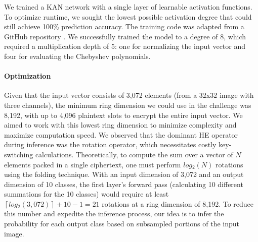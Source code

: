 \documentclass[article]{iacrtrans}
\begin{document}
We trained a KAN network with a single layer of learnable activation functions. To optimize runtime, we sought the lowest possible activation degree that could still achieve 100\% prediction accuracy. The training code was adapted from a GitHub repository \cite{ChebyKAN}. We successfully trained the model to a degree of 8, which required a multiplication depth of 5: one for normalizing the input vector and four for evaluating the Chebyshev polynomials.

\paragraph{Optimization}\mbox{}

Given that the input vector consists of 3,072 elements (from a 32x32 image with three channels), the minimum ring dimension we could use in the challenge was 8,192, with up to 4,096 plaintext slots to encrypt the entire input vector. We aimed to work with this lowest ring dimension to minimize complexity and maximize computation speed. We observed that the dominant HE operator during inference was the rotation operator, which necessitates costly key-switching calculations. Theoretically, to compute the sum over a vector of $N$ elements packed in a single ciphertext, one must perform $log⁡_2(N)$ rotations using the folding technique. With an input dimension of 3,072 and an output dimension of 10 classes, the first layer's forward pass (calculating 10 different summations for the 10 classes) would require at least $\left\lceil log⁡_2(3,072)\right\rceil+10−1=21$ rotations at a ring dimension of 8,192. To reduce this number and expedite the inference process, our idea is to infer the probability for each output class based on subsampled portions of the input image.
\end{document}

